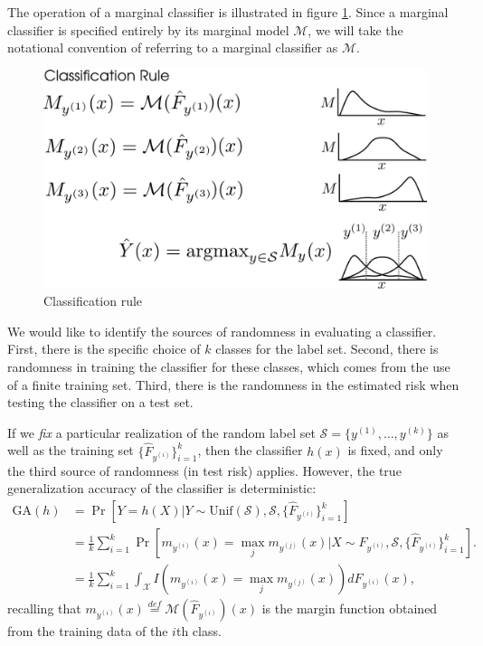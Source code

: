 \documentclass[12pt]{article}
\begin{document}
The operation of a marginal classifier is illustrated in figure
\ref{fig:classification_rule}.  Since a marginal classifier is
specified entirely by its marginal model $\mathcal{M}$, we will take
the notational convention of referring to a marginal classifier as
$\mathcal{M}$.

\begin{figure}[h]
\centering
\includegraphics[scale = 0.4]{classification_rule.png}
\caption{Classification rule}\label{fig:classification_rule}
\end{figure}

We would like to identify the sources of randomness in evaluating a
classifier.  First, there is the specific choice of $k$ classes for
the label set.   Second, there is randomness in training the classifier
for these classes, which comes from the use of a finite training
set. Third, there is the randomness in the estimated risk when
testing the classifier on a test set.

If we \emph{fix} a particular realization of the random label set
$\mathcal{S} = \{y^{(1)}, \hdots, y^{(k)}\}$ as well as the training
set $\{\hat{F}_{y^{(i)}}\}_{i=1}^k$, then the classifier $h(x)$ is
fixed, and only the third source of randomness (in test risk) applies.
However, the true generalization accuracy of the classifier is deterministic:
\begin{align*}
\text{GA}(h) &= \Pr[Y = h(X)|Y \sim \text{Unif}(\mathcal{S}),
  \mathcal{S}, \{\hat{F}_{y^{(i)}}\}_{i=1}^k] 
\\&= \frac{1}{k}
\sum_{i=1}^k \Pr[m_{y^{(i)}}(x) = \max_j m_{y^{(j)}}(x)|X \sim
  F_{y^{(i)}}, \mathcal{S}, \{\hat{F}_{y^{(i)}}\}_{i=1}^k].  
\\&= \frac{1}{k}
\sum_{i=1}^k \int_{\mathcal{X}} I(m_{y^{(i)}}(x) = \max_j m_{y^{(j)}}(x)) dF_{y^{(i)}}(x),
\end{align*}
recalling that $m_{y^{(i)}}(x) \stackrel{def}{=}
\mathcal{M}(\hat{F}_{y^{(i)}})(x)$ is the margin function obtained
from the training data of the $i$th class.
\end{document}
